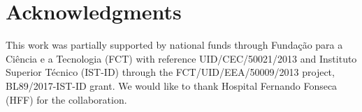 \documentclass{chi-ext}
\begin{document}

\section{Acknowledgments}

This work was partially supported by national funds through Funda\c{c}\~{a}o para a Ci\^{e}ncia e a Tecnologia (FCT) with reference UID/CEC/50021/2013 and Instituto Superior T\'{e}cnico (IST-ID) through the FCT/UID/EEA/50009/2013 project, BL89/2017-IST-ID grant. We would like to thank Hospital Fernando Fonseca (HFF) for the collaboration.

\balance


\end{document}
